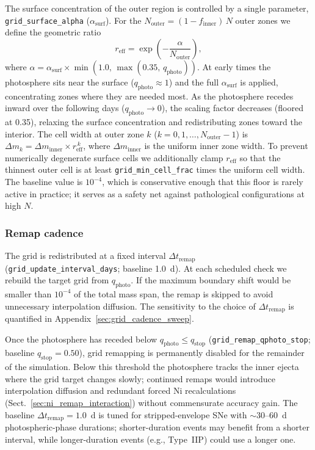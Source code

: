 \documentclass[twocolumn,linenumbers]{aastex701}
\begin{document}
The surface concentration of the outer region is controlled by a single parameter, \texttt{grid\_surface\_\-alpha} ($\alpha_{\mathrm{surf}}$). For the $N_{\mathrm{outer}} = (1 - f_{\mathrm{inner}})\,N$ outer zones we define the geometric ratio
\begin{equation}
r_{\mathrm{eff}} = \exp\!\left(-\frac{\alpha}{N_{\mathrm{outer}}}\right),
\label{eq:r_eff}
\end{equation}
where $\alpha = \alpha_{\mathrm{surf}} \times \min(1.0,\,\max(0.35,\, q_{\mathrm{photo}}))$. At early times the photosphere sits near the surface ($q_{\mathrm{photo}} \approx 1$) and the full $\alpha_{\mathrm{surf}}$ is applied, concentrating zones where they are needed most. As the photosphere recedes inward over the following days ($q_{\mathrm{photo}} \rightarrow 0$), the scaling factor decreases (floored at 0.35), relaxing the surface concentration and redistributing zones toward the interior. The cell width at outer zone $k$ ($k = 0, 1, \ldots, N_{\mathrm{outer}}-1$) is $\Delta m_k = \Delta m_{\mathrm{inner}} \times r_{\mathrm{eff}}^{\,k}$, where $\Delta m_{\mathrm{inner}}$ is the uniform inner zone width. To prevent numerically degenerate surface cells we additionally clamp $r_{\mathrm{eff}}$ so that the thinnest outer cell is at least \texttt{grid\_min\_cell\_\-frac} times the uniform cell width. The baseline value is $10^{-4}$, which is conservative enough that this floor is rarely active in practice; it serves as a safety net against pathological configurations at high $N$.


\subsubsection{Remap cadence}
\label{sec:remap_scheduling}
The grid is redistributed at a fixed interval $\Delta t_{\mathrm{remap}}$ (\texttt{grid\_update\_\-interval\_days}; baseline 1.0~d). At each scheduled check we rebuild the target grid from $q_{\mathrm{photo}}$. If the maximum boundary shift would be smaller than $10^{-4}$ of the total mass span, the remap is skipped to avoid unnecessary interpolation diffusion. The sensitivity to the choice of $\Delta t_{\mathrm{remap}}$ is quantified in Appendix~\ref{sec:grid_cadence_sweep}.

Once the photosphere has receded below $q_\mathrm{photo} \le q_\mathrm{stop}$ (\texttt{grid\_remap\_\-qphoto\_stop}; baseline $q_\mathrm{stop} = 0.50$), grid remapping is permanently disabled for the remainder of the simulation. Below this threshold the photosphere tracks the inner ejecta where the grid target changes slowly; continued remaps would introduce interpolation diffusion and redundant forced Ni recalculations (Sect.~\ref{sec:ni_remap_interaction}) without commensurate accuracy gain. The baseline $\Delta t_{\mathrm{remap}} = 1.0$~d is tuned for stripped-envelope SNe with ${\sim}30$--$60$~d photospheric-phase durations; shorter-duration events may benefit from a shorter interval, while longer-duration events (e.g., Type~IIP) could use a longer one.
\end{document}
